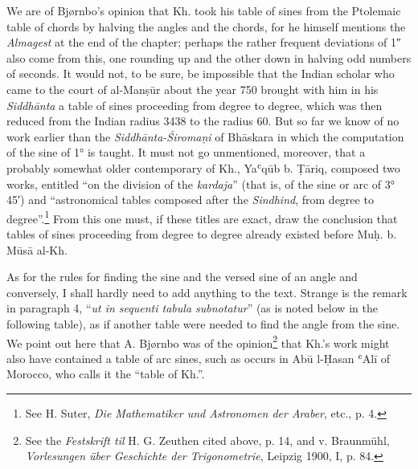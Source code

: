 \documentclass[11pt]{article}
\newcommand{\Pg}[1]{\marginpar{\footnotesize\color{gray}#1}}
\begin{document}
\par \Pg{70}We are of Bjørnbo's opinion that Kh. took his table of sines from the Ptolemaic table of chords by halving the angles and the chords, for he himself mentions the \emph{Almagest} at the end of the chapter; perhaps the rather frequent deviations of 1″ also come from this, one rounding up and the other down in halving odd numbers of seconds. It would not, to be sure, be impossible that the Indian scholar who came to the court of al-Manṣūr about the year 750 brought with him in his \emph{Siddhānta} a table of sines proceeding from degree to degree, which was then reduced from the Indian radius 3438 to the radius 60. But so far we know of no work earlier than the \emph{Siddhānta-Śiromaṇi} of Bhāskara in which the computation of the sine of 1° is taught. It must not go unmentioned, moreover, that a probably somewhat older contemporary of Kh., Yaʿqūb b. Ṭāriq, composed two works, entitled “on the division of the \emph{kardaja}” (that is, of the sine or arc of 3° 45′) and “astronomical tables composed after the \emph{Sindhind}, from degree to degree”.\footnote{See H. Suter, \emph{Die Mathematiker und Astronomen der Araber}, etc., p. 4.} From this one must, if \Pg{71}these titles are exact, draw the conclusion that tables of sines proceeding from degree to degree already existed before Muḥ. b. Mūsā al-Kh.\par
\par As for the rules for finding the sine and the versed sine of an angle and conversely, I shall hardly need to add anything to the text. Strange is the remark in paragraph 4, “\emph{ut in sequenti tabula subnotatur}” (as is noted below in the following table), as if another table were needed to find the angle from the sine. We point out here that A. Bjørnbo was of the opinion\footnote{See the \emph{Festskrift til} H. G. Zeuthen cited above, p. 14, and v. Braunmühl, \emph{Vorlesungen über Geschichte der Trigonometrie}, Leipzig 1900, I, p. 84.} that Kh.'s work might also have contained a table of arc sines, such as occurs in Abū l-Ḥasan ʿAlī of Morocco, who calls it the “table of Kh.”.\par
\end{document}
